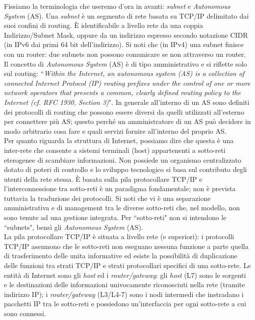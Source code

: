 Fissiamo la terminologia che useremo d'ora in avanti: \textit{subnet} e \textit{Autonomous System} (AS). Una \textit{subnet} è un segmento di rete basata su TCP/IP delimitato dai suoi confini di routing. È identificabile a livello rete da una coppia Indirizzo/Subnet Mask, oppure da un indirizzo espresso secondo notazione CIDR (in IPv6 dai primi 64 bit dell'indirizzo). Si noti che (in IPv4) una subnet finisce con un router: due subnets non possono comunicare se non attraverso un router. Il concetto di \textit{Autonomous System} (AS) è di tipo amministrativo e si riflette solo sul routing: \textquotedblleft\textit{Within the Internet, an autonomous system (AS) is a collection of connected Internet Protocol (IP) routing prefixes under the control of one or more network operators that presents a common, clearly defined routing policy to the Internet (cf. RFC 1930, Section 3)}". In generale all'interno di un AS sono definiti dei protocolli di routing che possono essere diversi da quelli utilizzati all'esterno per connettere più AS; questo perché un amministratore di un AS può decidere in modo arbitrario cosa fare e quali servizi fornire all'interno del proprio AS.\\
Per quanto riguarda la struttura di Internet, possiamo dire che questa è una inter-rete che consente a sistemi terminali (host) appartenenti a sotto-reti eterogenee di scambiare informazioni. Non possiede un organismo centralizzato dotato di poteri di controllo e lo sviluppo tecnologico si basa sul contributo degli utenti della rete stessa. È basata sulla pila protocollare TCP/IP e l'interconnessione tra sotto-reti è un paradigma fondamentale; non è prevista tuttavia la traduzione dei protocolli. Si noti che vi è una separazione amministrativa e di management tra le diverse sotto-reti che, nel modello, non sono tenute ad una gestione integrata. Per \textquotedblleft sotto-reti" non si intendono le \textquotedblleft subnets", bensì gli \textit{Autonomous System} (AS).\\
La pila protocollare TCP/IP è situata a livello rete (e superiori): i protocolli TCP/IP assumono che le sotto-reti non eseguano nessuna funzione a parte quella di trasferimento delle unita informative ed esiste la possibilità di duplicazione delle funzioni tra strati TCP/IP e strati protocollari specifici di una sotto-rete. Le entità di Internet sono gli \textit{host} ed i \textit{router/gateway}: gli \textit{host} (L7) sono le sorgenti e le destinazioni delle informazioni univocamente riconosciuti nella rete (tramite indirizzo IP); i \textit{router/gateway} (L3/L4-7) sono i nodi intermedi che instradano i pacchetti IP tra le sotto-reti e possiedono un'interfaccia per ogni sotto-rete a cui sono connessi.\\
